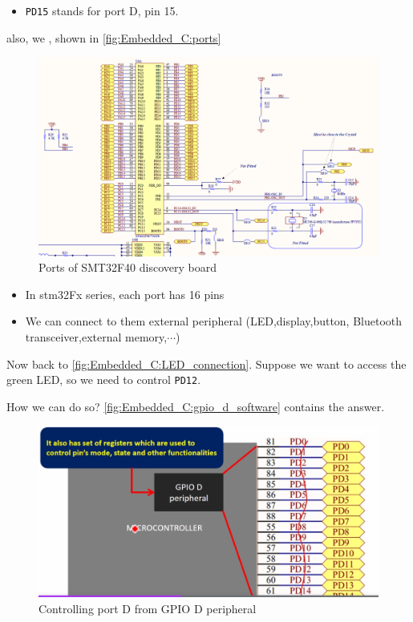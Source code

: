\begin{itemize}
    \item \verb|PD15| stands for port D, pin 15.
\end{itemize}

\newpage
{} also, we , shown in  \autoref{fig:Embedded_C:ports}

\begin{figure}[h]
\centering
\includegraphics[scale=0.7]{Figures/Embedded_C/ports}
\caption{Ports of SMT32F40 discovery board}
\label{fig:Embedded_C:ports}
\end{figure}

\begin{itemize}
    \item In stm32Fx series, each port has 16 pins
    
    \item We can connect to them external peripheral (LED,display,button, Bluetooth transceiver,external memory,$\cdots$)
\end{itemize}

\newpage
Now back to \autoref{fig:Embedded_C:LED_connection}. Suppose we want to access the green LED, so we need to control \verb|PD12|.


How we can do so? \autoref{fig:Embedded_C:gpio_d_software} contains the answer.
 
\begin{figure}[h]
\centering
\includegraphics[scale=0.7]{Figures/Embedded_C/gpio_d_software}
\caption{Controlling port D from GPIO D peripheral}
\label{fig:Embedded_C:gpio_d_software}
\end{figure}
 

